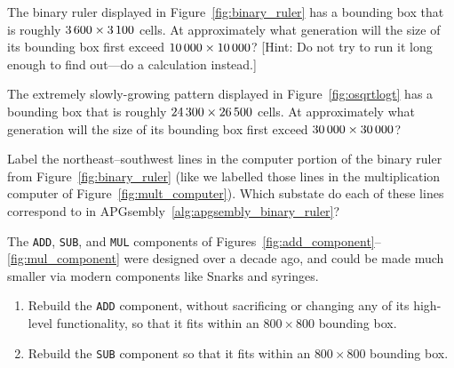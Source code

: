 \begin{multicols}{2}
	
	\mfilbreak
	
	
	\begin{problemstar}\label{exer:binary_ruler_when_big} 
		The binary ruler displayed in Figure~\ref{fig:binary_ruler} has a bounding box that is roughly $3{\,}600 \times 3{\,}100$ cells. At approximately what generation will the size of its bounding box first exceed $10{\,}000 \times 10{\,}000$? [Hint: Do not try to run it long enough to find out---do a calculation instead.]
	\end{problemstar}


	\mfilbreak
	
	
	\begin{problem}\label{exer:osqrtlogt_ruler_when_big} 
		The extremely slowly-growing pattern displayed in Figure~\ref{fig:osqrtlogt} has a bounding box that is roughly $24{\,}300 \times 26{\,}500$ cells. At approximately what generation will the size of its bounding box first exceed $30{\,}000 \times 30{\,}000$?
	\end{problem}


	\mfilbreak
	
	
	\begin{problem}\label{exer:binary_ruler_label} 
		Label the northeast--southwest lines in the computer portion of the binary ruler from Figure~\ref{fig:binary_ruler} (like we labelled those lines in the multiplication computer of Figure~\ref{fig:mult_computer}). Which substate do each of these lines correspond to in APGsembly~\ref{alg:apgsembly_binary_ruler}?
	\end{problem}


	\mfilbreak
	
	
	\begin{problem}\label{exer:update_add_sub_mult} 
		The \texttt{ADD}, \texttt{SUB}, and \texttt{MUL} components of Figures~\ref{fig:add_component}--\ref{fig:mul_component} were designed over a decade ago, and could be made much smaller via modern components like Snarks and syringes.\smallskip
		
		\begin{enumerate}[label=\bf\color{ocre}(\alph*)]
			\item Rebuild the \texttt{ADD} component, without sacrificing or changing any of its high-level functionality, so that it fits within an $800 \times 800$ bounding box.
			
			\item Rebuild the \texttt{SUB} component so that it fits within an $800 \times 800$ bounding box.
			

\end{enumerate}
\end{problem}
\end{multicols}
